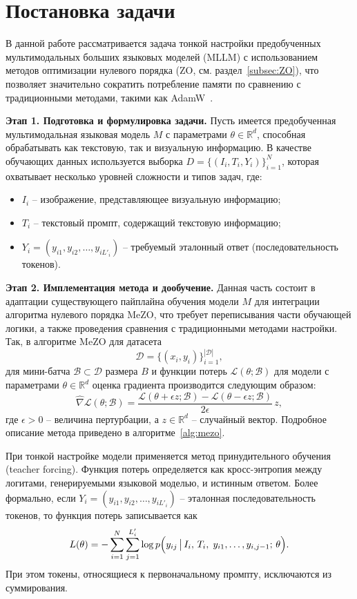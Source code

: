 \documentclass[LI,KR]{HSEUniversity}
\begin{document}
\chapter{Постановка задачи}

В данной работе рассматривается задача тонкой настройки предобученных мультимодальных больших языковых моделей (MLLM) с использованием методов оптимизации нулевого порядка (ZO, см. раздел~\ref{subsec:ZO}), что позволяет значительно сократить потребление памяти по сравнению с традиционными методами, такими как AdamW~\cite{adam, adamw}.

\textbf{Этап 1. Подготовка и формулировка задачи.} Пусть имеется предобученная мультимодальная языковая модель $ M $ с параметрами $ \theta \in \mathbb{R}^{d} $, способная обрабатывать как текстовую, так и визуальную информацию.
В качестве обучающих данных используется выборка $D = \{(I_i, T_i, Y_i)\}_{i=1}^{N}$,
которая охватывает несколько уровней сложности и типов задач, где:
\begin{itemize}
    \item $ I_i $ – изображение, представляющее визуальную информацию;
    \item $ T_i $ – текстовый промпт, содержащий текстовую информацию;
    \item $ Y_i = (y_{i1}, y_{i2}, \dots, y_{iL'_i}) $ – требуемый эталонный ответ (последовательность токенов).
\end{itemize}

\textbf{Этап 2. Имплементация метода и дообучение.} Данная часть состоит в адаптации существующего пайплайна обучения модели $ M $ для интеграции алгоритма нулевого порядка MeZO, что требует переписывания части обучающей логики, а также проведения сравнения с традиционными методами настройки.
Так, в алгоритме MeZO для датасета
$$
\mathcal{D} = \{(x_i, y_i)\}_{i=1}^{|\mathcal{D}|},
$$
для мини-батча $ \mathcal{B} \subset \mathcal{D} $ размера $ B $ и функции потерь $ \mathcal{L}(\theta; \mathcal{B}) $ для модели с параметрами $ \theta \in \mathbb{R}^{d} $ оценка градиента производится следующим образом:
$$
\widehat{\nabla} \mathcal{L}(\theta; \mathcal{B}) = \frac{\mathcal{L}(\theta + \epsilon z; \mathcal{B}) - \mathcal{L}(\theta - \epsilon z; \mathcal{B})}{2\epsilon}\, z,
$$
где $ \epsilon > 0 $ – величина пертурбации, а $ z \in \mathbb{R}^{d} $ – случайный вектор.
Подробное описание метода приведено в алгоритме~\ref{alg:mezo}.

При тонкой настройке модели применяется метод принудительного обучения (teacher forcing).
Функция потерь определяется как кросс-энтропия между логитами, генерируемыми языковой моделью, и истинным ответом.
Более формально, если $Y_i = (y_{i1}, y_{i2}, \dots, y_{iL'_i})$ – эталонная последовательность токенов,
то функция потерь записывается как
$$
L(\theta) = - \sum_{i=1}^{N} \sum_{j=1}^{L'_i} \log p\Bigl(y_{ij} \,\bigl|\, I_i,\, T_i,\; y_{i1}, \dots, y_{i,j-1};\, \theta\Bigr).
$$
При этом токены, относящиеся к первоначальному промпту, исключаются из суммирования.
\end{document}
